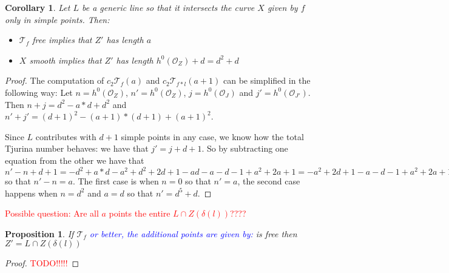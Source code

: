 \documentclass{article}
\newtheorem{corollary}{Corollary}[theorem]
\newtheorem{proposition}[theorem]{Proposition}
\begin{document}
\begin{corollary}
    Let $L$ be a generic line so that it intersects the curve $X$ given by $f$ only in simple points. Then:
    \begin{itemize}
        \item $\mathcal{T}_f$ free implies that $Z'$ has length $a$
        \item $X$ smooth implies that $Z'$ has length $h^0(\mathcal{O}_Z) + d = d^2+d$
    \end{itemize}
\end{corollary}
\begin{proof}
    The computation of $c_2 \mathcal{T}_f(a)$ and $c_2 \mathcal{T}_{f*l}(a+1)$ can be simplified in the following way: Let $n = h^0(\mathcal{O}_Z)$, $n' = h^0(\mathcal{O}_Z)$, $j = h^0(\mathcal{O}_J)$ and $j' = h^0(\mathcal{O}_{J'})$. Then $n+j = d^2 - a*d + d^2$ and $n'+j' = (d+1)^2 - (a+1)*(d+1) + (a+1)^2$.

    Since $L$ contributes with $d+1$ simple points in any case, we know how the total Tjurina number behaves: we have that $j' = j + d + 1$. So by subtracting one equation from the other we have that $n'-n +d+1= -d^2+a*d-a^2 + d^2+2d+1 - ad - a - d - 1 + a^2+2a+1 = -a^2+2d+1-a-d-1+a^2+2a+1 = d+a+1$ so that $n'-n = a$. The first case is when $n=0$ so that $n' = a$, the second case happens when $n = d^2$ and $a = d$ so that $n' = d^5+d$.
\end{proof}

\textcolor{red}{Possible question: Are all $a$ points the entire $L \cap Z(\delta(l))$????}

\begin{proposition}
    If $\mathcal{T}_f$ \textcolor{blue}{or better, the additional points are given by:} is free then $Z' = L \cap Z(\delta(l))$
\end{proposition}
\begin{proof}
    \textcolor{red}{TODO!!!!!}
\end{proof}
\end{document}
